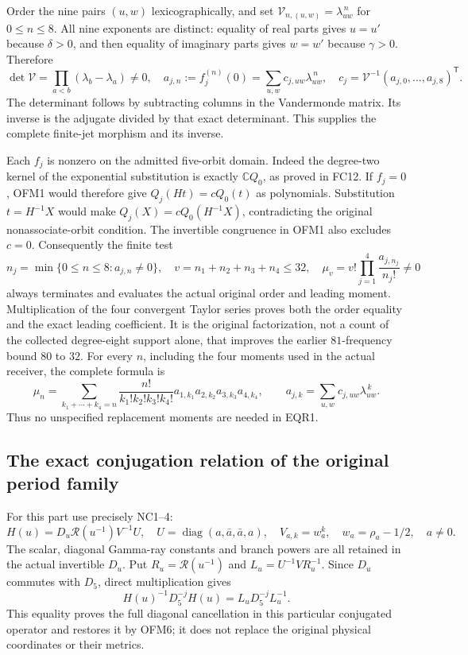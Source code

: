 \documentclass[11pt]{article}
\begin{document}
Order the nine pairs $(u,w)$ lexicographically, and set
$\mathcal V_{n,(u,w)}=\lambda_{uw}^{\,n}$ for $0\le n\le8$.
All nine exponents are distinct: equality of real parts gives $u=u'$
because $\delta>0$, and then equality of imaginary parts gives $w=w'$
because $\gamma>0$. Therefore
\[
 \det\mathcal V=\prod_{a<b}(\lambda_b-\lambda_a)\ne0,
 \quad a_{j,n}:=f_j^{(n)}(0)=\sum_{u,w}c_{j,uw}\lambda_{uw}^{\,n},
 \quad c_j=\mathcal V^{-1}(a_{j,0},\ldots,a_{j,8})^{\mathsf T}.
 \tag{OFM3}
\]
The determinant follows by subtracting columns in the Vandermonde
matrix. Its inverse is the adjugate divided by that exact determinant.
This supplies the complete finite-jet morphism and its inverse.

Each $f_j$ is nonzero on the admitted five-orbit domain. Indeed the
degree-two kernel of the exponential substitution is exactly
$\mathbb C Q_0$, as proved in FC12. If $f_j=0$, OFM1 would therefore
give $Q_j(Ht)=cQ_0(t)$ as polynomials. Substitution $t=H^{-1}X$
would make $Q_j(X)=cQ_0(H^{-1}X)$, contradicting the original
nonassociate-orbit condition. The invertible congruence in OFM1 also
excludes $c=0$. Consequently the finite test
\[
 n_j=\min\{0\le n\le8:a_{j,n}\ne0\},\quad
 v=n_1+n_2+n_3+n_4\le32,\quad
 \boxed{\mu_v=v!\prod_{j=1}^4\frac{a_{j,n_j}}{n_j!}\ne0}
 \tag{OFM4}
\]
always terminates and evaluates the actual original order and leading
moment. Multiplication of the four convergent Taylor series proves
both the order equality and the exact leading coefficient. It is the
original factorization, not a count of the collected degree-eight
support alone, that improves the earlier $81$-frequency bound $80$ to $32$.
For every $n$, including the four moments used in the actual receiver,
the complete formula is
\[
 \mu_n=\sum_{k_1+\cdots+k_4=n}
       \frac{n!}{k_1!k_2!k_3!k_4!}
       a_{1,k_1}a_{2,k_2}a_{3,k_3}a_{4,k_4},\qquad
 a_{j,k}=\sum_{u,w}c_{j,uw}\lambda_{uw}^{\,k}.
 \tag{OFM5}
\]
Thus no unspecified replacement moments are needed in EQR1.

\subsection{The exact conjugation relation of the original period family}
For this part use precisely NC1--4:
\[
 H(u)=D_u\mathcal R(u^{-1})V^{-1}U,\quad
 U=\operatorname{diag}(a,\bar a,\bar a,a),\quad
 V_{a,k}=w_a^k,\quad w_a=\rho_a-1/2,
 \quad a\ne0.
 \tag{OFM6}
\]
The scalar, diagonal Gamma-ray constants and branch powers are all
retained in the actual invertible $D_u$. Put
$R_u=\mathcal R(u^{-1})$ and $L_u=U^{-1}VR_u^{-1}$.
Since $D_u$ commutes with $D_5$, direct multiplication gives
\[
 H(u)^{-1}D_5^{-j}H(u)=L_uD_5^{-j}L_u^{-1}.
 \tag{OFM7}
\]
This equality proves the full diagonal cancellation in this particular
conjugated operator and restores it by OFM6; it does not replace the
original physical coordinates or their metrics.
\end{document}
